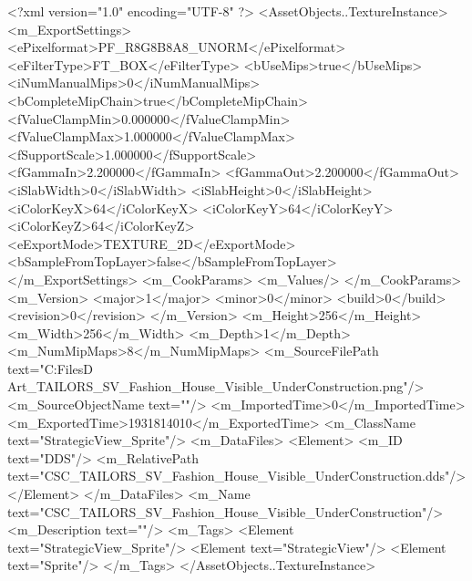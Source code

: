 <?xml version="1.0" encoding="UTF-8" ?>
<AssetObjects..TextureInstance>
	<m_ExportSettings>
		<ePixelformat>PF_R8G8B8A8_UNORM</ePixelformat>
		<eFilterType>FT_BOX</eFilterType>
		<bUseMips>true</bUseMips>
		<iNumManualMips>0</iNumManualMips>
		<bCompleteMipChain>true</bCompleteMipChain>
		<fValueClampMin>0.000000</fValueClampMin>
		<fValueClampMax>1.000000</fValueClampMax>
		<fSupportScale>1.000000</fSupportScale>
		<fGammaIn>2.200000</fGammaIn>
		<fGammaOut>2.200000</fGammaOut>
		<iSlabWidth>0</iSlabWidth>
		<iSlabHeight>0</iSlabHeight>
		<iColorKeyX>64</iColorKeyX>
		<iColorKeyY>64</iColorKeyY>
		<iColorKeyZ>64</iColorKeyZ>
		<eExportMode>TEXTURE_2D</eExportMode>
		<bSampleFromTopLayer>false</bSampleFromTopLayer>
	</m_ExportSettings>
	<m_CookParams>
		<m_Values/>
	</m_CookParams>
	<m_Version>
		<major>1</major>
		<minor>0</minor>
		<build>0</build>
		<revision>0</revision>
	</m_Version>
	<m_Height>256</m_Height>
	<m_Width>256</m_Width>
	<m_Depth>1</m_Depth>
	<m_NumMipMaps>8</m_NumMipMaps>
	<m_SourceFilePath text="C:\Users\Shadow\Desktop\Working Files\2D Art\Quarters\Tailors\StrategicView\CSC_TAILORS_SV_Fashion_House_Visible_UnderConstruction.png"/>
	<m_SourceObjectName text=""/>
	<m_ImportedTime>0</m_ImportedTime>
	<m_ExportedTime>1931814010</m_ExportedTime>
	<m_ClassName text="StrategicView_Sprite"/>
	<m_DataFiles>
		<Element>
			<m_ID text="DDS"/>
			<m_RelativePath text="CSC_TAILORS_SV_Fashion_House_Visible_UnderConstruction.dds"/>
		</Element>
	</m_DataFiles>
	<m_Name text="CSC_TAILORS_SV_Fashion_House_Visible_UnderConstruction"/>
	<m_Description text=""/>
	<m_Tags>
		<Element text="StrategicView_Sprite"/>
		<Element text="StrategicView"/>
		<Element text="Sprite"/>
	</m_Tags>
</AssetObjects..TextureInstance>

